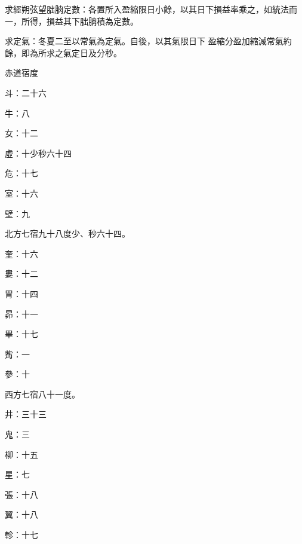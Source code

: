 \begin{pinyinscope}
 求經朔弦望朏朒定數：各置所入盈縮限日小餘，以其日下損益率乘之，如統法而一，所得，損益其下朏朒積為定數。



 求定氣：冬夏二至以常氣為定氣。自後，以其氣限日下
 盈縮分盈加縮減常氣約餘，即為所求之氣定日及分秒。



 赤道宿度



 斗：二十六



 牛：八



 女：十二



 虛：十少秒六十四



 危：十七



 室：十六



 壁：九



 北方七宿九十八度少、秒六十四。



 奎：十六



 婁：十二



 胃：十四



 昴：十一



 畢：十七



 觜：一



 參：十



 西方七宿八十一度。



 井：三十三



 鬼：三



 柳：十五



 星：七



 張：十八



 翼：十八



 軫：十七




\end{pinyinscope}
